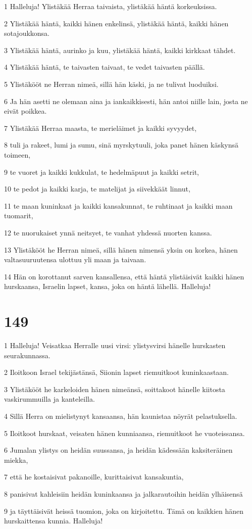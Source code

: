 \par 1 Halleluja! Ylistäkää Herraa taivaista, ylistäkää häntä korkeuksissa.
\par 2 Ylistäkää häntä, kaikki hänen enkelinsä, ylistäkää häntä, kaikki hänen sotajoukkonsa.
\par 3 Ylistäkää häntä, aurinko ja kuu, ylistäkää häntä, kaikki kirkkaat tähdet.
\par 4 Ylistäkää häntä, te taivasten taivaat, te vedet taivasten päällä.
\par 5 Ylistäkööt ne Herran nimeä, sillä hän käski, ja ne tulivat luoduiksi.
\par 6 Ja hän asetti ne olemaan aina ja iankaikkisesti, hän antoi niille lain, josta ne eivät poikkea.
\par 7 Ylistäkää Herraa maasta, te merieläimet ja kaikki syvyydet,
\par 8 tuli ja rakeet, lumi ja sumu, sinä myrskytuuli, joka panet hänen käskynsä toimeen,
\par 9 te vuoret ja kaikki kukkulat, te hedelmäpuut ja kaikki setrit,
\par 10 te pedot ja kaikki karja, te matelijat ja siivekkäät linnut,
\par 11 te maan kuninkaat ja kaikki kansakunnat, te ruhtinaat ja kaikki maan tuomarit,
\par 12 te nuorukaiset ynnä neitsyet, te vanhat yhdessä nuorten kanssa.
\par 13 Ylistäkööt he Herran nimeä, sillä hänen nimensä yksin on korkea, hänen valtasuuruutensa ulottuu yli maan ja taivaan.
\par 14 Hän on korottanut sarven kansallensa, että häntä ylistäisivät kaikki hänen hurskaansa, Israelin lapset, kansa, joka on häntä lähellä. Halleluja!

\chapter{149}

\par 1 Halleluja! Veisatkaa Herralle uusi virsi: ylistysvirsi hänelle hurskasten seurakunnassa.
\par 2 Iloitkoon Israel tekijästänsä, Siionin lapset riemuitkoot kuninkaastaan.
\par 3 Ylistäkööt he karkeloiden hänen nimeänsä, soittakoot hänelle kiitosta vaskirummuilla ja kanteleilla.
\par 4 Sillä Herra on mielistynyt kansaansa, hän kaunistaa nöyrät pelastuksella.
\par 5 Iloitkoot hurskaat, veisaten hänen kunniaansa, riemuitkoot he vuoteissansa.
\par 6 Jumalan ylistys on heidän suussansa, ja heidän kädessään kaksiteräinen miekka,
\par 7 että he kostaisivat pakanoille, kurittaisivat kansakuntia,
\par 8 panisivat kahleisiin heidän kuninkaansa ja jalkarautoihin heidän ylhäisensä
\par 9 ja täyttäisivät heissä tuomion, joka on kirjoitettu. Tämä on kaikkien hänen hurskaittensa kunnia. Halleluja!

